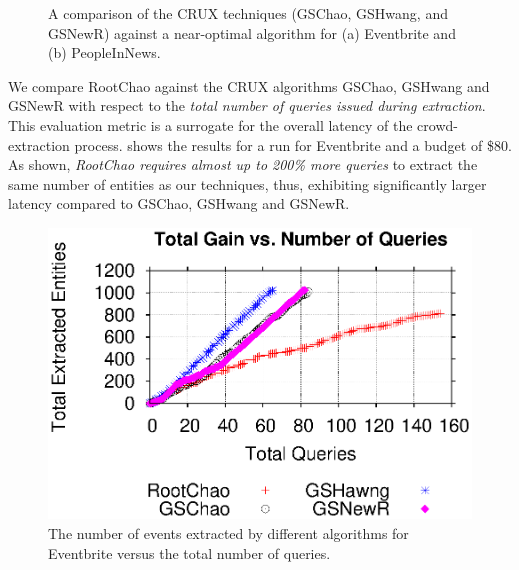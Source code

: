 \begin{figure}
\begin{center}
\end{center}
\caption{A comparison of the CRUX techniques (GSChao, GSHwang, and GSNewR) against a near-optimal algorithm for (a) Eventbrite and (b) PeopleInNews.}
\label{fig:resultsextr}
\vspace{-10pt}
\end{figure}

We compare RootChao against the CRUX algorithms GSChao, GSHwang and GSNewR with respect to the {\em total number of queries issued during extraction}. This evaluation metric is a surrogate for the overall latency of the crowd-extraction process.  shows the results for a run for Eventbrite and a budget of \$80. As shown, {\em RootChao requires almost up to 200\% more queries} to extract the same number of entities as our techniques, thus, exhibiting significantly larger latency compared to GSChao, GSHwang and GSNewR.

\begin{figure}
	\begin{center}
	\includegraphics[clip,scale=0.5]{figs/gain_rounds.eps}
	\caption{The number of events extracted by different algorithms for Eventbrite versus the total number of queries.}
	\label{fig:rounds}
	\end{center}
	\vspace{-20pt}
\end{figure}

